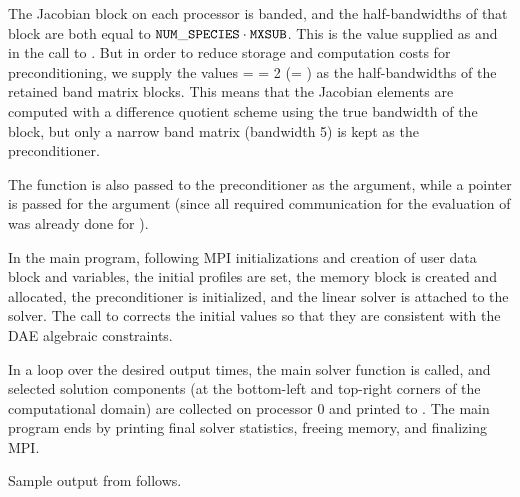 The Jacobian block on each processor is banded, and the half-bandwidths of
that block are both equal to ${\tt NUM\_SPECIES}\cdot{\tt MXSUB}$.
This is the value supplied as  and  in the call to
.  But in order to reduce storage and computation costs for
preconditioning, we supply the values  =  = 2
(= ) as the half-bandwidths of the retained band matrix blocks.
This means that the Jacobian elements are computed with a difference quotient
scheme using the true bandwidth of the block, but only a narrow band
matrix (bandwidth 5) is kept as the preconditioner.

The function  is also passed to the {\idabbdpre} preconditioner
as the  argument, while a  pointer is passed for the 
argument (since all required communication for the evaluation of  was
already done for ).

In the  main program, following MPI initializations and
creation of user data block  and  variables,
the initial profiles are set, the {\ida} memory block is created and
allocated, the {\idabbdpre} preconditioner is initialized, and the
{\idaspgmr} linear solver is attached to the {\ida} solver.
The call to  corrects the initial values so that they are
consistent with the DAE algebraic constraints.  

In a loop over the desired output times, the main solver function 
is called, and selected solution components (at the bottom-left and top-right
corners of the computational domain) are collected on processor 0 and printed
to . The main program ends by printing final solver statistics,
freeing memory, and finalizing MPI.

Sample output from  follows.

